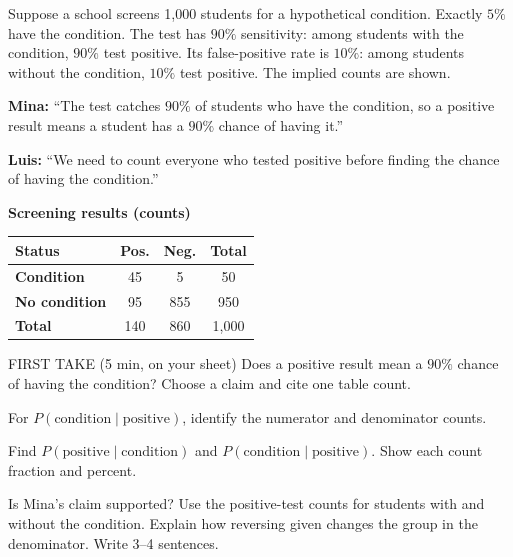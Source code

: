 \documentclass[14pt]{extarticle}
\begin{document}
\pagestyle{empty}


\noindent\begin{minipage}[t]{0.57\linewidth}
\vspace{0pt}
Suppose a school screens 1{,}000 students for a hypothetical condition. Exactly $5\%$ have the condition. The test has $90\%$ sensitivity: among students with the condition, $90\%$ test positive. Its false-positive rate is $10\%$: among students without the condition, $10\%$ test positive. The implied counts are shown.\par\smallskip \textbf{Mina:} ``The test catches $90\%$ of students who have the condition, so a positive result means a student has a $90\%$ chance of having it.''\par \textbf{Luis:} ``We need to count everyone who tested positive before finding the chance of having the condition.''\par
\end{minipage}\hfill
\begin{minipage}[t]{0.40\linewidth}
\vspace{0pt}
\begin{center}
\textbf{Screening results (counts)}\par\smallskip
\begin{tabular}{|l|c|c|c|}
\hline
\textbf{Status} & \textbf{Pos.} & \textbf{Neg.} & \textbf{Total} \\ \hline
\textbf{Condition} & 45 & 5 & 50 \\ \hline
\textbf{No condition} & 95 & 855 & 950 \\ \hline
\textbf{Total} & 140 & 860 & 1{,}000 \\ \hline
\end{tabular}
\end{center}
\end{minipage}

\begin{firsttakebox}{FIRST TAKE (5 min, on your sheet)}
Does a positive result mean a $90\%$ chance of having the condition? Choose a claim and cite one table count.
\end{firsttakebox}

\begin{description}[leftmargin=1.15in, labelwidth=1in, itemsep=2pt, topsep=2pt]
  \item[\dokbadge{1}~(a)] For $P(\text{condition}\mid\text{positive})$, identify the numerator and denominator counts.
  \item[\dokbadge{2}~(b)] Find $P(\text{positive}\mid\text{condition})$ and $P(\text{condition}\mid\text{positive})$. Show each count fraction and percent.
  \item[\dokbadge{3}~(c)] Is Mina's claim supported? Use the positive-test counts for students with and without the condition. Explain how reversing given changes the group in the denominator. Write 3--4 sentences.
\end{description}
\end{document}
